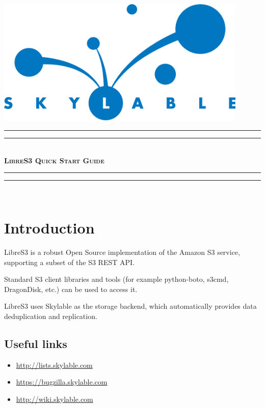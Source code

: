 \pagestyle{empty}

\begin{center}
    \includegraphics[width=120mm]{logo.eps}\\
    \vspace{4cm}
    \rule{\textwidth}{1.6pt}\vspace*{-\baselineskip}\vspace*{2pt}
    \rule{\textwidth}{0.4pt}\\[\baselineskip]
    {\fontsize{40}{50}\bfseries\scshape LibreS3 Quick Start Guide}
    \rule{\textwidth}{0.4pt}\vspace*{-\baselineskip}\vspace{3.2pt}
    \rule{\textwidth}{1.6pt}\\[\baselineskip]
\end{center}


\LARGE
\chapter{Introduction}

\indent LibreS3 is a robust Open Source implementation of the Amazon S3 service,
supporting a subset of the S3 REST API.

Standard S3 client libraries and tools (for example python-boto, s3cmd, DragonDisk, etc.) can
be used to access it.

LibreS3 uses Skylable \SX as the storage backend, which automatically provides data
deduplication and replication.\\

\section*{Useful links}
\begin{itemize}
    \item \url{http://lists.skylable.com}
    \item \url{https://bugzilla.skylable.com}
    \item \url{http://wiki.skylable.com}
\end{itemize}

